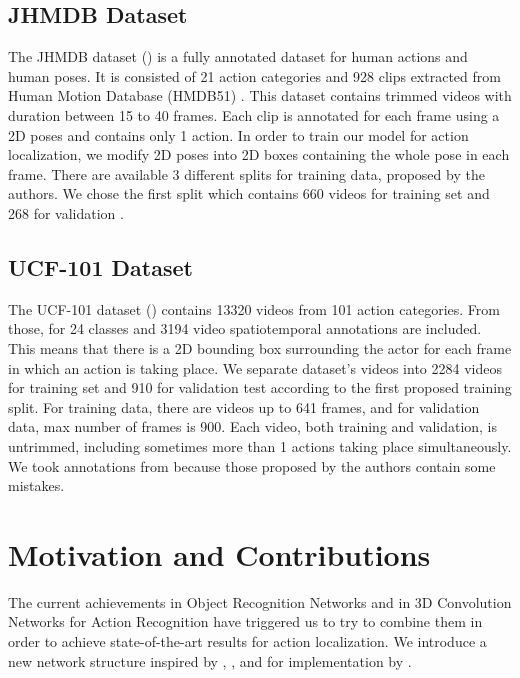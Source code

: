 \subsection{JHMDB Dataset}
The JHMDB dataset (\cite{Jhuang:ICCV:2013}) is a fully annotated dataset for human actions and human poses. It is consisted of 21 action categories and 928
clips extracted from Human Motion Database (HMDB51) \cite{Kuehne11}. This dataset contains trimmed videos with duration between
15 to 40 frames. Each clip is annotated for each frame using a 2D poses and contains only 1 action.
In order to train our model for action localization, we modify 2D poses into 2D boxes containing the whole pose in each frame.
There are available 3 different splits for training data, proposed by the authors. We chose the first split which contains 660
videos for training set and 268 for validation . 

\subsection{UCF-101 Dataset}
The UCF-101 dataset (\cite{soomro2012ucf101}) contains 13320 videos from 101 action categories.
From those, for 24 classes and 3194 video spatiotemporal annotations are included. This means that there is a 2D bounding box surrounding the actor for each frame in which an action is taking place.
We separate dataset's videos into 2284 videos for training set and 910 for validation test according to the
first proposed training split. For training data, there are videos up to 641 frames, and for validation data, max number of frames is 900.
Each video, both training and validation, is untrimmed, including sometimes more than 1 actions taking place simultaneously.
We took annotations from \cite{singh2016online} because those  proposed by the authors contain some mistakes.

\section{Motivation and Contributions}
The current achievements in Object Recognition Networks and in 3D Convolution Networks for Action Recognition have triggered us to try
to combine them in order to achieve state-of-the-art results for action localization. We introduce a new network structure inspired by
\cite{DBLP:journals/corr/HouCS17}, \cite{DBLP:journals/corr/abs-1712-09184},\cite{Ren:2015:FRT:2969239.2969250} and for implementation
by \cite{jjfaster2rcnn}.

